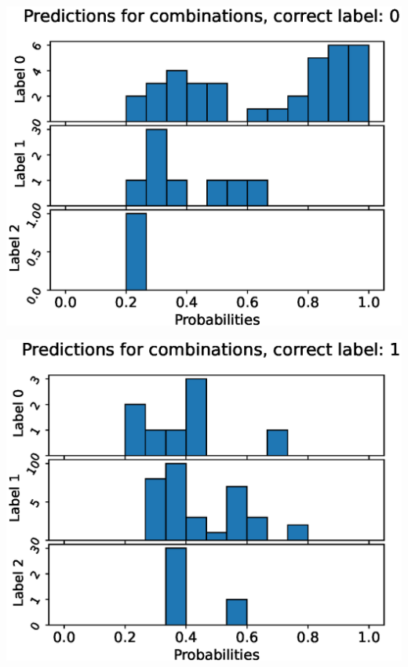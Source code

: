 \begin{center}
\begin{minipage}{0.33\textwidth}
  \includegraphics[width=\textwidth]{files/figs/app/hists/pelvis/pc0.eps}
\end{minipage}%
\begin{minipage}{0.33\textwidth}
  \includegraphics[width=\textwidth]{files/figs/app/hists/pelvis/pc1.eps}
\end{minipage}%
\begin{minipage}{0.33\textwidth}

\end{minipage}
\end{center}

